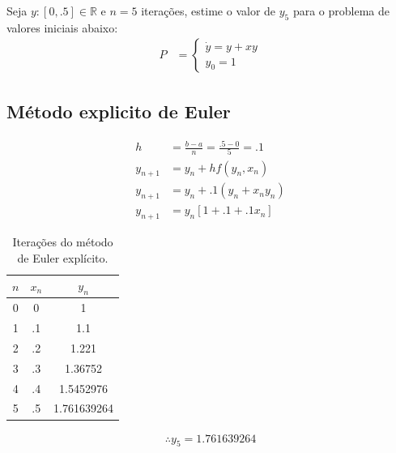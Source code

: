 \documentclass{article}
\begin{document}
	Seja $y \colon [0, .5] \in \mathbb{R}$ e $n=5$ iterações, estime o valor de  $y_5$ para o problema de valores iniciais abaixo:
	\begin{align*}
		P &= \begin{cases}
		\dot{y} = y +xy \\
		y_0 = 1
		\end{cases}
	\end{align*}

	\subsection{Método explicito de Euler}
		\begin{align*}
			h &= \frac{b-a}{n} = \frac{.5-0}{5} = .1 \\
			y_{n+1} &= y_n + hf(y_n, x_n) \\
			y_{n+1} &= y_n + .1 (y_n + x_n y_n) \\
			y_{n+1} &= y_n[1 + .1 + .1x_n]
		\end{align*}
		\begin{table}[H]
			\centering
			\begin{tabular}{|c|c|c|}
				\hline
				$n$ & $x_n$ & $y_n$ \\\hline
				0       &  0    & 1      \\\hline
				1       & .1    & 1.1  \\\hline
				2       & .2    & 1.221 \\\hline
				3       & .3    & 1.36752 \\\hline
				4       & .4    & 1.5452976 \\\hline
				5       & .5    & 1.761639264 \\\hline
			\end{tabular}
			\captionsetup{justification=centering}
			\caption{Iterações do método de Euler explícito.}
		\end{table}
		\begin{align*}
		\therefore
		y_5 = 1.761639264
		\end{align*}
	
\end{document}
